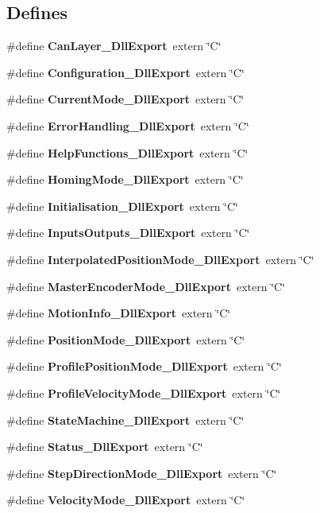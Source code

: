 \subsection*{\-Defines}
\begin{DoxyCompactItemize}
\item 
\#define {\bf \-Can\-Layer\-\_\-\-Dll\-Export}~extern \char`\"{}\-C\char`\"{}
\item 
\#define {\bf \-Configuration\-\_\-\-Dll\-Export}~extern \char`\"{}\-C\char`\"{}
\item 
\#define {\bf \-Current\-Mode\-\_\-\-Dll\-Export}~extern \char`\"{}\-C\char`\"{}
\item 
\#define {\bf \-Error\-Handling\-\_\-\-Dll\-Export}~extern \char`\"{}\-C\char`\"{}
\item 
\#define {\bf \-Help\-Functions\-\_\-\-Dll\-Export}~extern \char`\"{}\-C\char`\"{}
\item 
\#define {\bf \-Homing\-Mode\-\_\-\-Dll\-Export}~extern \char`\"{}\-C\char`\"{}
\item 
\#define {\bf \-Initialisation\-\_\-\-Dll\-Export}~extern \char`\"{}\-C\char`\"{}
\item 
\#define {\bf \-Inputs\-Outputs\-\_\-\-Dll\-Export}~extern \char`\"{}\-C\char`\"{}
\item 
\#define {\bf \-Interpolated\-Position\-Mode\-\_\-\-Dll\-Export}~extern \char`\"{}\-C\char`\"{}
\item 
\#define {\bf \-Master\-Encoder\-Mode\-\_\-\-Dll\-Export}~extern \char`\"{}\-C\char`\"{}
\item 
\#define {\bf \-Motion\-Info\-\_\-\-Dll\-Export}~extern \char`\"{}\-C\char`\"{}
\item 
\#define {\bf \-Position\-Mode\-\_\-\-Dll\-Export}~extern \char`\"{}\-C\char`\"{}
\item 
\#define {\bf \-Profile\-Position\-Mode\-\_\-\-Dll\-Export}~extern \char`\"{}\-C\char`\"{}
\item 
\#define {\bf \-Profile\-Velocity\-Mode\-\_\-\-Dll\-Export}~extern \char`\"{}\-C\char`\"{}
\item 
\#define {\bf \-State\-Machine\-\_\-\-Dll\-Export}~extern \char`\"{}\-C\char`\"{}
\item 
\#define {\bf \-Status\-\_\-\-Dll\-Export}~extern \char`\"{}\-C\char`\"{}
\item 
\#define {\bf \-Step\-Direction\-Mode\-\_\-\-Dll\-Export}~extern \char`\"{}\-C\char`\"{}
\item 
\#define {\bf \-Velocity\-Mode\-\_\-\-Dll\-Export}~extern \char`\"{}\-C\char`\"{}
\end{DoxyCompactItemize}
